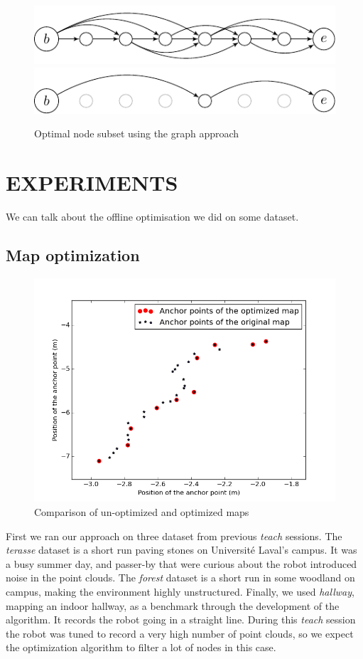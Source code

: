 \documentclass[letterpaper,10 pt,conference]{ieeeconf}
\begin{document}
\begin{figure}[thpb]
  \centering
  \includegraphics[scale=1.0]{unoptimized-graph}
  \includegraphics[scale=1.0]{optimized-graph}
  \caption{Optimal node subset using the graph approach}
\end{figure}


\section{EXPERIMENTS}
We can talk about the offline optimisation we did on some dataset.

\subsection{Map optimization}

\begin{figure}
  \centering
  \includegraphics[scale=0.4]{map_optimization}
  \caption{Comparison of un-optimized and optimized maps}
\end{figure}

First we ran our approach on three dataset from previous \textit{teach} sessions. The
\textit{terasse} dataset is a short run paving stones on Université Laval's campus. It was a busy
summer day, and passer-by that were curious about the robot introduced noise in the point
clouds. The \textit{forest} dataset is a short run in some woodland on campus, making the environment
highly unstructured. Finally, we used \textit{hallway}, mapping an indoor hallway, as a
benchmark through the development of the algorithm. It records the robot going in a straight line.
During this \textit{teach} session the robot was tuned to record a very high number of point clouds,
so we expect the optimization algorithm to filter a lot of nodes in this case.
\end{document}
